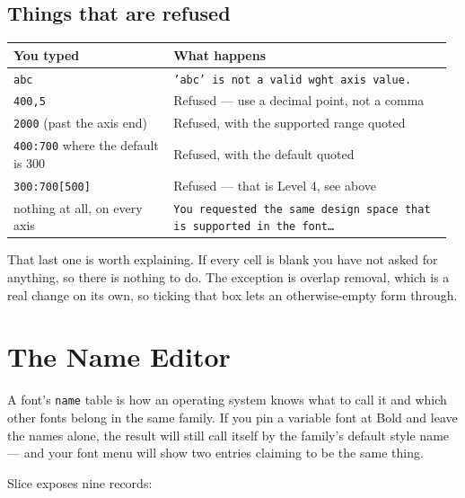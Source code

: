 \documentclass[11pt,a4paper]{article}
\begin{document}
\subsection{Things that are refused}

\begin{longtable}{>{\RaggedRight\arraybackslash}p{0.3508510638297872\linewidth}>{\RaggedRight\arraybackslash}p{0.6191489361702127\linewidth}}
\toprule
\textbf{You typed} & \textbf{What happens} \\
\midrule\endhead
\texttt{abc} & \texttt{'abc' is not a valid wght axis value.} \\
\texttt{400,5} & Refused --- use a decimal point, not a comma \\
\texttt{2000} (past the axis end) & Refused, with the supported range quoted \\
\texttt{400:700} where the default is 300 & Refused, with the default quoted \\
\texttt{300:700[500]} & Refused --- that is Level 4, see above \\
nothing at all, on every axis & \texttt{You requested the same design space that is supported in the font…} \\
\bottomrule
\end{longtable}

That last one is worth explaining. If every cell is blank you have not asked for anything, so there is nothing to do. The exception is overlap removal, which is a real change on its own, so ticking that box lets an otherwise-empty form through.

\section{The Name Editor}

A font's \texttt{name} table is how an operating system knows what to call it and which other fonts belong in the same family. If you pin a variable font at Bold and leave the names alone, the result will still call itself by the family's default style name --- and your font menu will show two entries claiming to be the same thing.

Slice exposes nine records:
\end{document}
